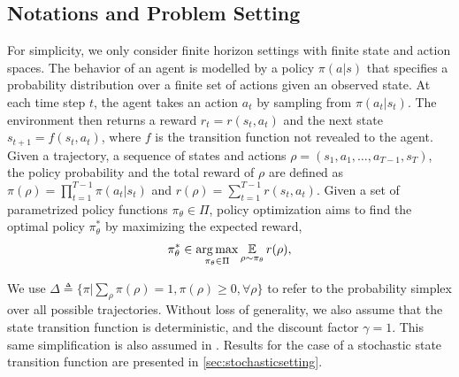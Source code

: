 \subsection{Notations and Problem Setting}
\label{subsec:notations_and_settings}

For simplicity, we only consider finite horizon
settings with finite state and action spaces. 
The behavior of an agent is modelled by a policy $\pi(a|s)$
that specifies a probability distribution over a finite set of actions
given an observed state. 
At each time step $t$, the agent takes an action $a_t$ by sampling from
$\pi(a_t | s_t)$.
The environment then returns a reward $r_t = r(s_t, a_t)$ and the next state
$s_{t+1} = f(s_t, a_t)$,
where $f$ is the transition function not revealed to the agent.
Given a trajectory, a sequence of states and actions
$\rho=(s_1, a_1, \dots, a_{T-1}, s_T)$,
the policy probability and the total reward of $\rho$ are defined as
$\pi(\rho) = \prod_{t=1}^{T-1} \pi(a_t| s_t)$
 and $r(\rho) = \sum_{t=1}^{T-1} r(s_t, a_t)$. 
Given a set of parametrized policy functions $\pi_\theta \in \Pi$,
policy optimization aims to find the optimal policy $\pi_\theta^*$
by maximizing the expected reward,
\begin{equation}
\label{max_expected_reward}
\begin{split}
\pi_\theta^* \in \operatorname*{arg\,max}_{\pi_\theta \in \Pi}{ \operatorname*{\mathbb{E}}\limits_{\rho \sim \pi_\theta}{r(\rho)} },
\end{split}
\end{equation}

We use
$\Delta \triangleq \{ \pi | \sum_{\rho}{\pi(\rho)} = 1, \pi(\rho) \ge 0,
\forall \rho \}$
to refer to the probability simplex over all possible trajectories. 
Without loss of generality, we also assume that the state transition function
is deterministic, and the discount factor $\gamma = 1$.
This same simplification is also assumed in \citet{nachum2017improving}. 
Results for the case of a stochastic state transition function are presented
in \cref{sec:stochasticsetting}.

